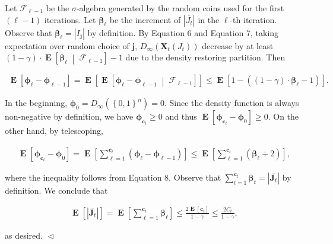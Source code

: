 Let $\mathcal{F}_{\ell-1}$ be the $\sigma$-algebra generated by the random coins used for the first $(\ell-1)$ iterations.
Let $\bm{\beta}_{\ell}$ be the increment of $|\overline{J_{t}}|$ in the $\ell$-th iteration.
Observe that $\bm{\beta}_{\ell}=|I_{\bm{j}}|$ by definition.
By Equation 6 and Equation 7,
taking expectation over random choice of $\bm{j}$,
$D_{\infty}(\bm{X}_{t}(J_{t}))$ decrease by at least $(1-\gamma)\cdot\operatorname*{\mathbf{E}}\left[\bm{\beta}_{\ell}\;\middle|\;\mathcal{F}_{\ell-1}\right]-1$ due to the density restoring partition.
Then\par


\[\begin{gathered}
\operatorname*{\mathbf{E}}\left[\bm{\phi}_{\ell}-\bm{\phi}_{\ell-1}\right]=\operatorname*{\mathbf{E}}\left[\operatorname*{\mathbf{E}}\left[\bm{\phi}_{\ell}-\bm{\phi}_{\ell-1}\;\middle|\;\mathcal{F}_{\ell-1}\right]\right]\leq\operatorname*{\mathbf{E}}\left[1-((1-\gamma)\cdot\bm{\beta}_{\ell}-1)\right].
\end{gathered}\]


In the beginning, $\bm{\phi}_{0}=D_{\infty}(\left\{0,1\right\}^{n})=0$.
Since the density function is always non-negative by definition, we have $\bm{\phi}_{\bm{c}_{t}}\geq 0$ and thus $\operatorname*{\mathbf{E}}\left[\bm{\phi}_{\bm{c}_{t}}-\bm{\phi}_{0}\right]\geq 0.$
On the other hand, by telescoping,\par


\[\begin{gathered}
\operatorname*{\mathbf{E}}\left[\bm{\phi}_{\bm{c}_{t}}-\bm{\phi}_{0}\right]=\operatorname*{\mathbf{E}}\left[\sum_{\ell=1}^{\bm{c}_{t}}(\bm{\phi}_{\ell}-\bm{\phi}_{\ell-1})\right]\leq\operatorname*{\mathbf{E}}\left[\sum_{\ell=1}^{\bm{c}_{t}}(\bm{\beta}_{\ell}+2)\right],
\end{gathered}\]


where the inequality follows from Equation 8.
Observe that
$\sum_{t=1}^{\bm{c}_{t}}\bm{\beta}_{t}=|\overline{\bm{J}_{t}}|$ by definition.
We conclude that\par


\[\begin{gathered}
\operatorname*{\mathbf{E}}\left[|\overline{\bm{J}_{t}}|\right]=\operatorname*{\mathbf{E}}\left[\sum_{\ell=1}^{\bm{c}_{t}}\bm{\beta}_{\ell}\right]\leq\frac{2\operatorname*{\mathbf{E}}\left[\bm{c}_{t}\right]}{1-\gamma}\leq\frac{2C_{t}}{1-\gamma},
\end{gathered}\]


as desired.
$\vartriangleleft$\par






